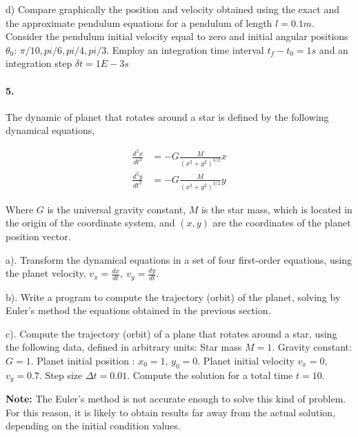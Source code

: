 d) Compare graphically the position and velocity obtained using the exact and the approximate pendulum equations for a pendulum of length $l = 0.1m$. Consider the pendulum initial velocity equal to zero and initial angular positions $\theta_0$: $\pi/10, pi/6, pi/4, pi/3$. Employ an integration time interval $t_f-t_0 =1s$ and an integration step $\delta t = 1E-3 s$

\paragraph{5.} The dynamic of planet that rotates around a star is defined by the following dynamical equations, 

\begin{align*}
\frac{d^2x}{dt^2} &= -G\frac{M}{(x^2+y^2)^{3/2}}x\\
\frac{d^2y}{dt^2} &= -G\frac{M}{(x^2+y^2)^{3/2}}y
\end{align*}


Where $G$ is the universal gravity constant, $M$ is the star mass, which is located in the origin of the coordinate system, and  $(x,y)$ are the coordinates of the planet position vector.

a). Transform the dynamical equations in a set of four first-order equations, using the planet velocity, $v_x = \frac{dx}{dt},\ v_y = \frac{dy}{dt} $.

b). Write a program to compute the trajectory (orbit) of the planet, solving by Euler's method the equations obtained in the previous section. 

c). Compute the trajectory (orbit) of a plane that rotates around a star, using the following data, defined in arbitrary units: Star mass $M=1$. Gravity constant: $G=1$. Planet initial position : $x_0 = 1$, $y_0=0$. Planet initial velocity $v_x = 0$, $v_y = 0.7$. Step size $\Delta t =0.01$. Compute the solution for a total time $t = 10$. 

\textbf{Note:} The Euler's method is not accurate enough to solve this kind of problem. For this reason, it is likely to obtain results far away from the actual solution, depending on the initial condition values.  

